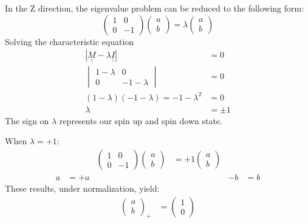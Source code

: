 \documentclass{jhwhw}
\begin{document}
In the Z direction, the eigenvalue problem can be reduced to the following form:
\begin{equation}
	\begin{pmatrix}
		1	&	0	\\
		0	&	-1
	\end{pmatrix}
	\begin{pmatrix}
		a	\\
		b
	\end{pmatrix}
	=
	\lambda
	\begin{pmatrix}
		a	\\
		b
	\end{pmatrix}
\end{equation}
Solving the characteristic equation
\begin{align}
	\left|\underline{\underline{M}} - \lambda \underline{\underline{I}}\right| &= 0
	\\
	\begin{vmatrix}
		1-\lambda	&	0		\\
		0			&	-1 - \lambda
	\end{vmatrix}
	&=
	0
	\\
	(1 -\lambda)(-1 - \lambda) = -1 - \lambda^2 &= 0
	\\
	\lambda &= \pm 1
\end{align}
The sign on $\lambda$ represents our spin up and spin down state.  

When $\lambda = +1$:
\begin{align}
	&&\begin{pmatrix}
		1	&	0	\\
		0	&	-1
	\end{pmatrix}
	\begin{pmatrix}
		a	\\
		b
	\end{pmatrix}
	&=
	+1
	\begin{pmatrix}
		a	\\
		b
	\end{pmatrix}
	&&
	\\
	 a &= +a &&& -b &= b
\end{align}
These results, under normalization, yield:
\begin{align}
	\begin{pmatrix}
		a	\\
		b
	\end{pmatrix}_+
	&=
	\begin{pmatrix}
		1	\\
		0
	\end{pmatrix}
\end{align}
\end{document}
